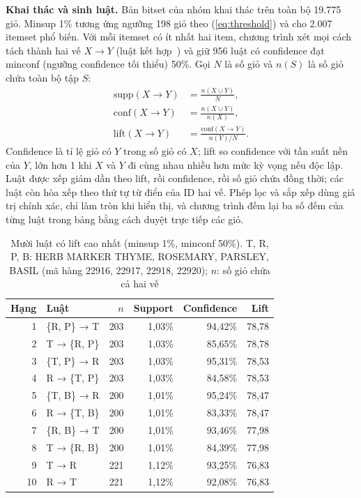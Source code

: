 \textbf{Khai thác và sinh luật.} Bản bitset của nhóm khai thác trên toàn bộ 19.775 giỏ. Minsup 1\% tương ứng
ngưỡng 198 giỏ theo (\ref{eq:threshold}) và cho 2.007 itemset phổ biến. Với mỗi itemset có ít nhất hai item,
chương trình xét mọi cách tách thành hai vế $X \to Y$ (luật kết hợp~\cite{agrawal1993mining}) và giữ 956 luật có
confidence đạt minconf (ngưỡng confidence tối thiểu) 50\%. Gọi $N$ là số giỏ và $n(S)$ là số giỏ chứa toàn bộ tập $S$:
\begin{equation}
\begin{aligned}
\mathrm{supp}(X \to Y) &= \frac{n(X \cup Y)}{N},\\
\mathrm{conf}(X \to Y) &= \frac{n(X \cup Y)}{n(X)},\\
\mathrm{lift}(X \to Y) &= \frac{\mathrm{conf}(X \to Y)}{n(Y)/N}.
\end{aligned}
\label{eq:rules}
\end{equation}
Confidence là tỉ lệ giỏ có $Y$ trong số giỏ có $X$; lift so confidence với tần suất nền của $Y$, lớn hơn 1 khi
$X$ và $Y$ đi cùng nhau nhiều hơn mức kỳ vọng nếu độc lập. Luật được xếp giảm dần theo lift, rồi confidence, rồi
số giỏ chứa đồng thời; các luật còn hòa xếp theo thứ tự từ điển của ID hai vế. Phép lọc và sắp xếp dùng giá trị
chính xác, chỉ làm tròn khi hiển thị, và chương trình đếm lại ba số đếm của từng luật trong bảng bằng cách duyệt
trực tiếp các giỏ.

\begin{table}[t]
\caption{Mười luật có lift cao nhất (minsup 1\%, minconf 50\%). T, R, P, B: HERB MARKER THYME, ROSEMARY,
PARSLEY, BASIL (mã hàng 22916, 22917, 22918, 22920); $n$: số giỏ chứa cả hai vế}
\label{tab:retail-rules}
\centering
\footnotesize
\setlength{\tabcolsep}{4pt}
\begin{tabular}{@{}rlrrrr@{}}
\toprule
Hạng & Luật & $n$ & Support & Confidence & Lift \\
\midrule
1 & \{R, P\} → T & 203 & 1,03\% & 94,42\% & 78,78 \\
2 & T → \{R, P\} & 203 & 1,03\% & 85,65\% & 78,78 \\
3 & \{T, P\} → R & 203 & 1,03\% & 95,31\% & 78,53 \\
4 & R → \{T, P\} & 203 & 1,03\% & 84,58\% & 78,53 \\
5 & \{T, B\} → R & 200 & 1,01\% & 95,24\% & 78,47 \\
6 & R → \{T, B\} & 200 & 1,01\% & 83,33\% & 78,47 \\
7 & \{R, B\} → T & 200 & 1,01\% & 93,46\% & 77,98 \\
8 & T → \{R, B\} & 200 & 1,01\% & 84,39\% & 77,98 \\
9 & T → R & 221 & 1,12\% & 93,25\% & 76,83 \\
10 & R → T & 221 & 1,12\% & 92,08\% & 76,83 \\
\bottomrule
\end{tabular}
\end{table}

